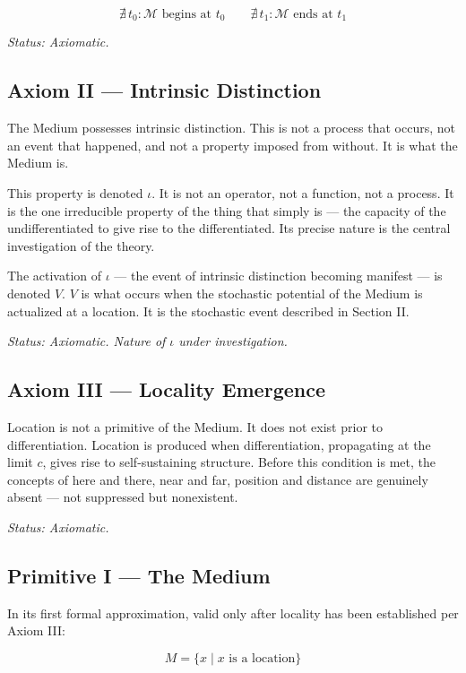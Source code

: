 \documentclass[11pt]{article}
\begin{document}
\begin{equation}
\nexists\, t_0 : \mathcal{M} \text{ begins at } t_0 \qquad
\nexists\, t_1 : \mathcal{M} \text{ ends at } t_1
\end{equation}

\emph{Status: Axiomatic.}
\subsection{Axiom II — Intrinsic Distinction}
\label{sec:org77a1eb1}

The Medium possesses intrinsic distinction. This is not a process that occurs,
not an event that happened, and not a property imposed from without. It is what
the Medium is.

This property is denoted \(\iota\). It is not an operator, not a function, not a
process. It is the one irreducible property of the thing that simply is — the
capacity of the undifferentiated to give rise to the differentiated. Its precise
nature is the central investigation of the theory.

The activation of \(\iota\) — the event of intrinsic distinction becoming manifest
— is denoted \(V\). \(V\) is what occurs when the stochastic potential of the Medium
is actualized at a location. It is the stochastic event described in Section II.

\emph{Status: Axiomatic. Nature of \(\iota\) under investigation.}
\subsection{Axiom III — Locality Emergence}
\label{sec:org51f8f99}

Location is not a primitive of the Medium. It does not exist prior to
differentiation. Location is produced when differentiation, propagating at the
limit \(c\), gives rise to self-sustaining structure. Before this condition is met,
the concepts of here and there, near and far, position and distance are genuinely
absent — not suppressed but nonexistent.

\emph{Status: Axiomatic.}
\subsection{Primitive I — The Medium}
\label{sec:org0e76341}

In its first formal approximation, valid only after locality has been established
per Axiom III:

\begin{equation}
M = \{x \mid x \text{ is a location}\}
\end{equation}
\end{document}
